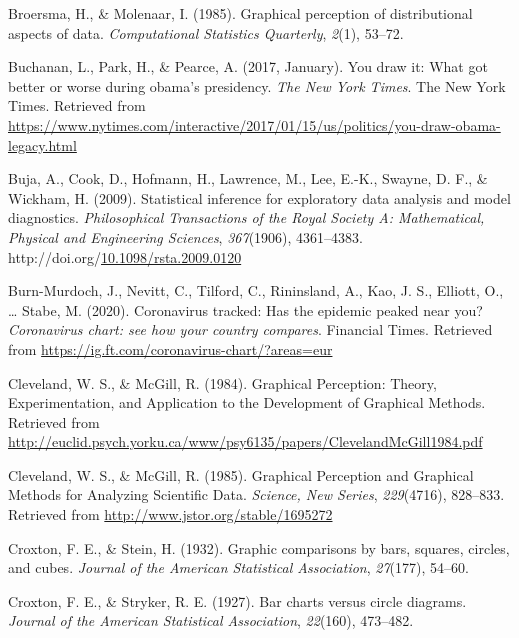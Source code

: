 \documentclass[print]{nuthesis}
\newlength{\cslhangindent}
\newenvironment{CSLReferences}%
{\setlength{\parindent}{0pt}%
\everypar{\setlength{\hangindent}{\cslhangindent}}\ignorespaces}%
{\par}
\begin{document}
\begin{CSLReferences}{1}{0}
\leavevmode\hypertarget{ref-broersma1985graphical}{}%
Broersma, H., \& Molenaar, I. (1985). Graphical perception of distributional aspects of data. \emph{Computational Statistics Quarterly}, \emph{2}(1), 53--72.

\leavevmode\hypertarget{ref-buchanan_park_pearce_2017}{}%
Buchanan, L., Park, H., \& Pearce, A. (2017, January). You draw it: What got better or worse during obama's presidency. \emph{The New York Times}. The New York Times. Retrieved from \url{https://www.nytimes.com/interactive/2017/01/15/us/politics/you-draw-obama-legacy.html}

\leavevmode\hypertarget{ref-buja_statistical_2009}{}%
Buja, A., Cook, D., Hofmann, H., Lawrence, M., Lee, E.-K., Swayne, D. F., \& Wickham, H. (2009). Statistical inference for exploratory data analysis and model diagnostics. \emph{Philosophical Transactions of the Royal Society A: Mathematical, Physical and Engineering Sciences}, \emph{367}(1906), 4361--4383. http://doi.org/\href{https://doi.org/10.1098/rsta.2009.0120}{10.1098/rsta.2009.0120}

\leavevmode\hypertarget{ref-burnmurdoch_2020}{}%
Burn-Murdoch, J., Nevitt, C., Tilford, C., Rininsland, A., Kao, J. S., Elliott, O., \ldots{} Stabe, M. (2020). Coronavirus tracked: Has the epidemic peaked near you? \emph{Coronavirus chart: see how your country compares}. Financial Times. Retrieved from \url{https://ig.ft.com/coronavirus-chart/?areas=eur}

\leavevmode\hypertarget{ref-cleveland_graphical_1984}{}%
Cleveland, W. S., \& McGill, R. (1984). Graphical {Perception}: {Theory}, {Experimentation}, and {Application} to the {Development} of {Graphical} {Methods}. Retrieved from \url{http://euclid.psych.yorku.ca/www/psy6135/papers/ClevelandMcGill1984.pdf}

\leavevmode\hypertarget{ref-cleveland_graphical_1985}{}%
Cleveland, W. S., \& McGill, R. (1985). Graphical {Perception} and {Graphical} {Methods} for {Analyzing} {Scientific} {Data}. \emph{Science, New Series}, \emph{229}(4716), 828--833. Retrieved from \url{http://www.jstor.org/stable/1695272}

\leavevmode\hypertarget{ref-croxton1932graphic}{}%
Croxton, F. E., \& Stein, H. (1932). Graphic comparisons by bars, squares, circles, and cubes. \emph{Journal of the American Statistical Association}, \emph{27}(177), 54--60.

\leavevmode\hypertarget{ref-croxton1927bar}{}%
Croxton, F. E., \& Stryker, R. E. (1927). Bar charts versus circle diagrams. \emph{Journal of the American Statistical Association}, \emph{22}(160), 473--482.


\end{CSLReferences}
\end{document}
